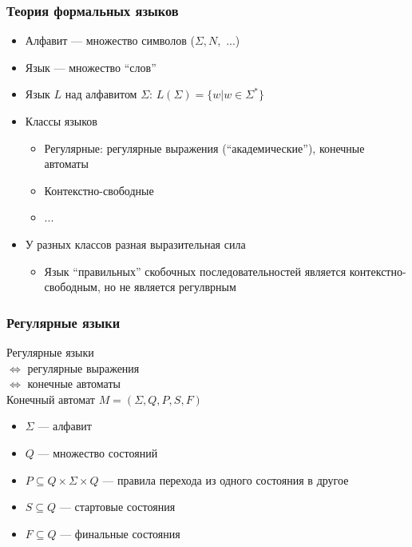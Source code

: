 \documentclass[xcolor=table]{beamer}
\begin{document}
\begin{frame}[fragile]
  \transwipe[direction=90]
  \frametitle{Теория формальных языков}
  \begin{itemize}
  \item Алфавит --- множество символов ($\Sigma, N,$ ...)
  \item Язык --- множество ``слов''
  \item Язык $L$ над алфавитом $\Sigma$: $L(\Sigma) = \{ w | w \in \Sigma^{*} \}$ 
  \item Классы языков
    \begin{itemize}
        \item Регулярные: регулярные выражения (``академические''), конечные автоматы
        \item Контекстно-свободные 
        \item ...
    \end{itemize}
  \item У разных классов разная выразительная сила
    \begin{itemize}
        \item Язык ``правильных'' скобочных последовательностей является контекстно-свободным, но не 
        является регулврным
    \end{itemize}
  \end{itemize}
\end{frame}

\begin{frame}[fragile]
  \transwipe[direction=90]
  \frametitle{Регулярные языки}
  Регулярные языки \\ $\Longleftrightarrow$ регулярные выражения \\ $\Longleftrightarrow$ конечные 
  автоматы \\
  Конечный автомат $M=(\Sigma,Q,P,S,F)$
      \begin{itemize}
        \item $\Sigma$ --- алфавит
        \item $Q$ --- множество состояний
        \item $P \subseteq Q \times \Sigma \times Q$ --- правила перехода из одного состояния в другое
        \item $S \subseteq Q$ --- стартовые состояния
        \item $F \subseteq Q$ --- финальные состояния
    \end{itemize}
\end{frame}
\end{document}
